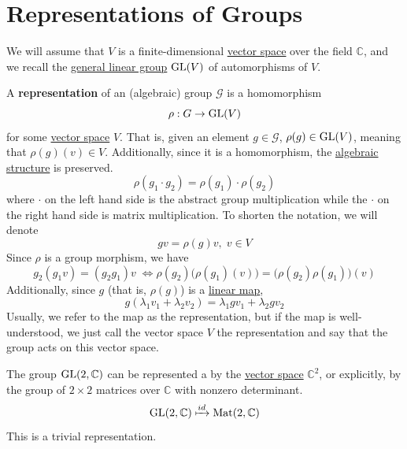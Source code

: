 \section{Representations of Groups}

  We will assume that $V$ is a finite-dimensional \hyperref[lin-def:vector-space]{vector space} over the field $\mathbb{C}$, and we recall the \hyperref[lin-def:general-linear-group]{general linear group} $\operatorname{GL}(V)$ of automorphisms of $V$.

  \begin{definition}[Representation]
    \label{def:representation}
    A \textbf{representation} of an (algebraic) group $\mathcal{G}$ is a homomorphism 
    \begin{equation}
      \rho: G \to \operatorname{GL}(V)
    \end{equation}
    for some \hyperref[lin-def:vector-space]{vector space} $V$. That is, given an element $g \in \mathcal{G}$, $\rho(g) \in \operatorname{GL} (V)$, meaning that $\rho(g)(v) \in V$. Additionally, since it is a homomorphism, the \hyperref[alg-def:algebraic-structure]{algebraic structure} is preserved. 
    \begin{equation}
      \rho(g_1 \cdot g_2) = \rho(g_1) \cdot \rho(g_2)
    \end{equation}
    where $\cdot$ on the left hand side is the abstract group multiplication while the $\cdot$ on the right hand side is matrix multiplication. To shorten the notation, we will denote 
    \begin{equation}
      g v = \rho(g) v, \; v \in V
    \end{equation}
    Since $\rho$ is a group morphism, we have 
    \begin{equation}
      g_2 (g_1 v) = (g_2 g_1) v \; \iff \rho(g_2) \big( \rho(g_1) (v) \big) = \big( \rho(g_2) \rho(g_1) \big) (v)
    \end{equation}
    Additionally, since $g$ (that is, $\rho(g)$) is a \hyperref[lin-def:linear_map]{linear map}, 
    \begin{equation}
      g(\lambda_1 v_1 + \lambda_2 v_2) = \lambda_1 g v_1 + \lambda_2 g v_2
    \end{equation}
    Usually, we refer to the map as the representation, but if the map is well-understood, we just call the vector space $V$ the representation and say that the group acts on this vector space. 
  \end{definition}

  \begin{example}
    \label{ex:representations-of-gl2c}
    The group $\operatorname{GL}(2, \mathbb{C})$ can be represented a by the \hyperref[lin-def:vector-space]{vector space} $\mathbb{C}^2$, or explicitly, by the group of $2 \times 2$ matrices over $\mathbb{C}$ with nonzero determinant.
    \begin{equation}
      \operatorname{GL}(2, \mathbb{C}) \xmapsto{id} \text{Mat}(2, \mathbb{C})
    \end{equation}
    This is a trivial representation. 
  \end{example}

